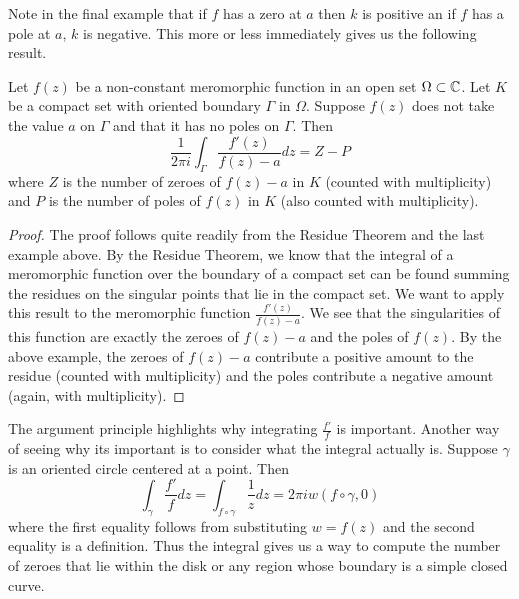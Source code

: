 Note in the final example that if $f$ has a zero at $a$ then $k$ is positive an if $f$ has a pole at $a$, $k$ is negative. This more or less immediately gives us the following result.
\begin{theorem}
Let $f(z)$ be a non-constant meromorphic function in an open set $\Omega \subset \mathbb{C}$. Let $K$ be a compact set with oriented boundary $\Gamma$ in $\Omega$. Suppose $f(z)$ does not take the value $a$ on $\Gamma$ and that it has no poles on $\Gamma$. Then
$$ \frac{1}{2\pi i} \int_{\Gamma} \frac{f'(z)}{f(z) - a}dz = Z - P $$
where $Z$ is the number of zeroes of $f(z) - a$ in $K$ (counted with multiplicity) and $P$ is the number of poles of $f(z)$ in $K$ (also counted with multiplicity).
\end{theorem}
\begin{proof}
The proof follows quite readily from the Residue Theorem and the last example above. By the Residue Theorem, we know that the integral of a meromorphic function over the boundary of a compact set can be found summing the residues on the singular points that lie in the compact set. We want to apply this result to the meromorphic function $\frac{f'(z)}{f(z) - a}$. We see that the singularities of this function are exactly the zeroes of $f(z) - a$ and the poles of $f(z)$. By the above example, the zeroes of $f(z) - a$ contribute a positive amount to the residue (counted with multiplicity) and the poles contribute a negative amount (again, with multiplicity). 
\end{proof}
The argument principle highlights why integrating $\frac{f'}{f}$ is important. Another way of seeing why its important is to consider what the integral actually is. Suppose $\gamma$ is an oriented circle centered at a point. Then
$$\int_{\gamma} \frac{f'}{f}dz = \int_{f \circ \gamma} \frac{1}{z} dz = 2\pi iw(f \circ \gamma, 0)$$
where the first equality follows from substituting $w = f(z)$ and the second equality is a definition. Thus the integral gives us a way to compute the number of zeroes that lie within the disk or any region whose boundary is a simple closed curve. 


